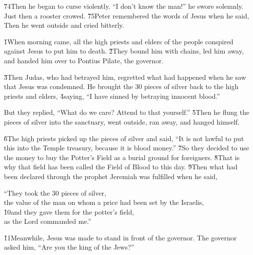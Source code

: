 \v{74}Then he began to curse violently. ``I don't know the man!'' he swore solemnly. Just then a rooster crowed. \v{75}Peter remembered the words of Jesus when he said,  Then he went outside and cried bitterly.

\v{1}When morning came, all the high priests and elders of the people conspired against Jesus to put him to death. \v{2}They bound him with chains, led him away, and handed him over to Pontius Pilate, the governor.

\v{3}Then Judas, who had betrayed him, regretted what had happened when he saw that Jesus was condemned. He brought the 30 pieces of silver back to the high priests and elders, \v{4}saying, ``I have sinned by betraying innocent blood.''

But they replied, ``What do we care? Attend to that yourself.'' \v{5}Then he flung the pieces of silver into the sanctuary, went outside, ran away, and hanged himself.

\v{6}The high priests picked up the pieces of silver and said, ``It is not lawful to put this into the Temple treasury, because it is blood money.'' \v{7}So they decided to use the money to buy the Potter's Field as a burial ground for foreigners. \v{8}That is why that field has been called the Field of Blood to this day. \v{9}Then what had been declared through the prophet Jeremiah was fulfilled when he said,

\begin{poetry}
\poeml ``They took the 30 pieces of silver, \\
\poemll    the value of the man on whom a price had been set by the Israelis, \\
\poeml \v{10}and they gave them for the potter's field, \\
\poemll    as the Lord commanded me.''
\end{poetry}

\v{11}Meanwhile, Jesus was made to stand in front of the governor. The governor asked him, ``Are you the king of the Jews?''


